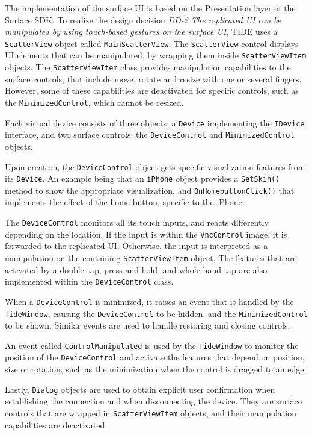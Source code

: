 The implementation of the surface UI is based on the Presentation layer of the Surface SDK.
To realize the design decision
\emph{DD-2 The replicated UI can be manipulated by using touch-based gestures on the surface UI},
TIDE uses a \texttt{ScatterView} object called \texttt{MainScatterView}.
The \texttt{ScatterView} control displays UI elements that can be manipulated, by wrapping them inside \texttt{ScatterViewItem} objects.
The \texttt{ScatterViewItem} class provides manipulation capabilities to the surface controls, that include move, rotate and resize with one or several fingers.
However, some of these capabilities are deactivated for specific controls, such as the \texttt{MinimizedControl}, which cannot be resized.

Each virtual device consists of three objects; a \texttt{Device} implementing the \texttt{IDevice} interface, and two surface controls; the \texttt{DeviceControl} and \texttt{MinimizedControl} objects.

Upon creation, the \texttt{DeviceControl} object gets specific visualization features from its \texttt{Device}.
An example being that an \texttt{iPhone} object provides a \texttt{SetSkin()} method to show the appropriate visualization, and \texttt{OnHomebuttonClick()} that implements the effect of the home button, specific to the iPhone.

The \texttt{DeviceControl} monitors all its touch inputs, and reacts differently depending on the location.
If the input is within the \texttt{VncControl} image, it is forwarded to the replicated UI.
Otherwise, the input is interpreted as a manipulation on the containing \texttt{ScatterViewItem} object.
The features that are activated by a double tap, press and hold, and whole hand tap are also implemented within the \texttt{DeviceControl} class.


When a \texttt{DeviceControl} is minimized, it raises an event that is handled by the \texttt{TideWindow}, causing the \texttt{DeviceControl} to be hidden, and the \texttt{MinimizedControl} to be shown.
Similar events are used to handle restoring and closing controls.

An event called \texttt{ControlManipulated} is used by the \texttt{TideWindow} to monitor the position of the \texttt{DeviceControl} and activate the features that depend on position, size or rotation; such as the minimization when the control is dragged to an edge.

Lastly, \texttt{Dialog} objects are used to obtain explicit user confirmation when establishing the connection and when disconnecting the device.
They are surface controls that are wrapped in \texttt{ScatterViewItem} objects, and their manipulation capabilities are deactivated.



